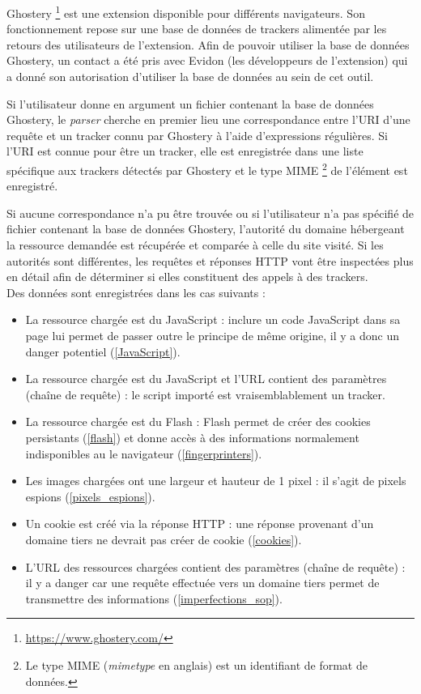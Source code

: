 Ghostery \footnote{\url{https://www.ghostery.com/}} est une extension disponible pour différents navigateurs. Son fonctionnement repose sur une base de données de trackers alimentée par les retours des utilisateurs de l'extension.
Afin de pouvoir utiliser la base de données Ghostery, un contact a été pris avec Evidon (les développeurs de l'extension) qui a donné son autorisation d'utiliser la base de données au sein de cet outil.
\newline

Si l'utilisateur donne en argument un fichier contenant la base de données Ghostery, le \textit{parser} cherche en premier lieu une correspondance entre l'URI d'une requête et un tracker connu par Ghostery à l'aide d'expressions régulières. Si l'URI est connue pour être un tracker, elle est enregistrée dans une liste spécifique aux trackers détectés par Ghostery et le type MIME \footnote{Le type MIME (\textit{mimetype} en anglais) est un identifiant de format de données.} de l'élément est enregistré.

Si aucune correspondance n'a pu être trouvée ou si l'utilisateur n'a pas spécifié de fichier contenant la base de données Ghostery, l'autorité du domaine hébergeant la ressource demandée est récupérée et comparée à celle du site visité. Si les autorités sont différentes, les requêtes et réponses HTTP vont être inspectées plus en détail afin de déterminer si elles constituent des appels à des trackers.\\
Des données sont enregistrées dans les cas suivants :
\begin{itemize}
	\item La ressource chargée est du JavaScript : inclure un code JavaScript dans sa page lui permet de passer outre le principe de même origine, il y a donc un danger potentiel (\autoref{JavaScript}).
	\item La ressource chargée est du JavaScript et l'URL contient des paramètres (chaîne de requête) : le script importé est vraisemblablement un tracker.
	\item La ressource chargée est du Flash : Flash permet de créer des cookies persistants (\autoref{flash}) et donne accès à des informations normalement indisponibles au le navigateur (\autoref{fingerprinters}).
	\item Les images chargées ont une largeur et hauteur de 1 pixel : il s'agit de pixels espions (\autoref{pixels_espions}).
	\item Un cookie est créé via la réponse HTTP : une réponse provenant d'un domaine tiers ne devrait pas créer de cookie (\autoref{cookies}).
	\item L'URL des ressources chargées contient des paramètres (chaîne de requête) : il y a danger car une requête effectuée vers un domaine tiers permet de transmettre des informations (\autoref{imperfections_sop}).
	\newline
\end{itemize}


